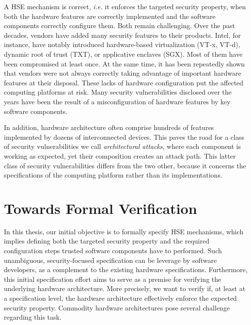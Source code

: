 A HSE mechanism is correct, \emph{i.e.} it enforces the targeted security
property, when both the hardware features are correctly implemented and the
software components correctly configure them.
%
Both remain challenging.
%
Over the past decades, vendors have added many security features to their
products.
%
Intel, for instance, have notably introduced hardware-based virtualization
(VT-x, VT-d), dynamic root of trust (TXT), or applicative enclaves (SGX).
%
Most of them have been compromised at least once.
%
At the same time, it has been repeatedly shown that vendors were not always
correctly taking advantage of important hardware features at their disposal.
%
These lacks of hardware configuration put the affected computing platforms at
risk.
%
Many security vulnerabilities disclosed over the years have been the result of a
misconfiguration of hardware features by key software components.

In addition, hardware architecture often comprise hundreds of features
implemented by dozens of interconnected devices.
%
This paves the road for a class of security vulnerabilities we call
\emph{architectural attacks}, where each component is working as expected, yet
their composition creates an attack path.
%
This latter class of security vulnerabilities differs from the two other,
because it concerns the specifications of the computing platform rather than its
implementations.

\section{Towards Formal Verification}

In this thesis, our initial objective is to formally specify HSE mechanisms,
which implies defining both the targeted security property and the required
configuration steps trusted software components have to performed.
%
Such unambiguous, security-focused specification can be leverage by software
developers, as a complement to the existing hardware specifications.
%
Furthermore, this initial specification effort aims to serve as a premise for
verifying the underlying hardware architecture.
%
More precisely, we want to verify if, at least at a specification level, the
hardware architecture effectively enforce the expected security property.
%
Commodity hardware architectures pose several challenge regarding
this task.


